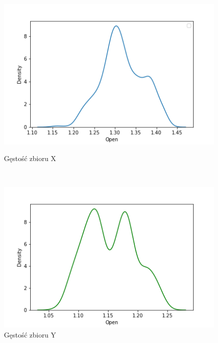 \documentclass[12pt]{mwart}
\begin{document}
\begin{figure}[H]
	\begin{minipage}{.5\linewidth}
		\centering
		\includegraphics[scale=0.7]{X_kde.PNG}
		\caption{Gęstość zbioru X}
	\end{minipage}
	$\quad$
	\begin{minipage}{.5\linewidth}
		\centering
		\includegraphics[scale=0.7]{Y_kde.PNG}
		\caption{Gęstość zbioru Y}
	\end{minipage}
\end{figure}
\end{document}
